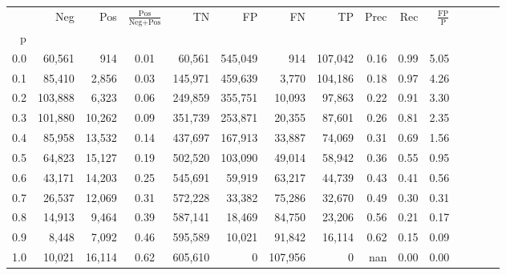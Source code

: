 \begin{tabular}{rrrcrrrrrrrrrrr}
\toprule
{} &      Neg &     Pos & $\frac{\text{Pos}}{\text{Neg}+\text{Pos}}$ &       TN &       FP &       FN &       TP &  Prec &   Rec & $\frac{\text{FP}}{\text{P}}$ \\
p   &          &         &                                            &          &          &          &          &       &       &                              \\
\midrule
0.0 &   60,561 &     914 &                                       0.01 &   60,561 &  545,049 &      914 &  107,042 &  0.16 &  0.99 &                         5.05 \\
0.1 &   85,410 &   2,856 &                                       0.03 &  145,971 &  459,639 &    3,770 &  104,186 &  0.18 &  0.97 &                         4.26 \\
0.2 &  103,888 &   6,323 &                                       0.06 &  249,859 &  355,751 &   10,093 &   97,863 &  0.22 &  0.91 &                         3.30 \\
0.3 &  101,880 &  10,262 &                                       0.09 &  351,739 &  253,871 &   20,355 &   87,601 &  0.26 &  0.81 &                         2.35 \\
0.4 &   85,958 &  13,532 &                                       0.14 &  437,697 &  167,913 &   33,887 &   74,069 &  0.31 &  0.69 &                         1.56 \\
0.5 &   64,823 &  15,127 &                                       0.19 &  502,520 &  103,090 &   49,014 &   58,942 &  0.36 &  0.55 &                         0.95 \\
0.6 &   43,171 &  14,203 &                                       0.25 &  545,691 &   59,919 &   63,217 &   44,739 &  0.43 &  0.41 &                         0.56 \\
0.7 &   26,537 &  12,069 &                                       0.31 &  572,228 &   33,382 &   75,286 &   32,670 &  0.49 &  0.30 &                         0.31 \\
0.8 &   14,913 &   9,464 &                                       0.39 &  587,141 &   18,469 &   84,750 &   23,206 &  0.56 &  0.21 &                         0.17 \\
0.9 &    8,448 &   7,092 &                                       0.46 &  595,589 &   10,021 &   91,842 &   16,114 &  0.62 &  0.15 &                         0.09 \\
1.0 &   10,021 &  16,114 &                                       0.62 &  605,610 &        0 &  107,956 &        0 &   nan &  0.00 &                         0.00 \\
\bottomrule
\end{tabular}
